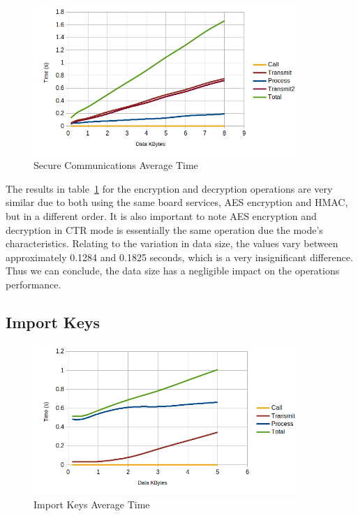 \begin{figure}[h!]
	\centering
	\includegraphics[width=0.9\textwidth]{./Images/op3-time.png}
	\caption{Secure Communications Average Time}
	\label{fig:performance:op34-time}
\end{figure}

The results in table~\ref{fig:performance:op34-time} for the encryption and decryption operations are very similar due to both using the same board services, AES encryption and HMAC, but in a different order. It is also important to note AES encryption and decryption in CTR mode is essentially the same operation due the mode's characteristics.
Relating to the variation in data size, the values vary between approximately 0.1284 and 0.1825 seconds, which is a very insignificant difference. Thus we can conclude, the data size has a negligible impact on the operations performance.

\subsection{Import Keys}\label{chap:evaluation:services:import-key}

\begin{figure}[h!]
	\centering
	\includegraphics[width=0.9\textwidth]{./Images/import-time.png}
	\caption{Import Keys Average Time}
	\label{fig:performance:import-time}
\end{figure}

